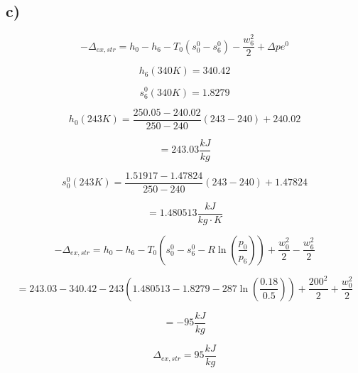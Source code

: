 

\subsection*{c)}

\[
-\Delta_{ex,str} = h_0 - h_6 - T_0 (s_0^0 - s_6^0) - \frac{w_6^2}{2} + \Delta p e^0
\]

\[
h_6 (340 K) = 340.42
\]

\[
s_6^0 (340 K) = 1.8279
\]

\[
h_0 (243 K) = \frac{250.05 - 240.02}{250 - 240} (243 - 240) + 240.02
\]

\[
= 243.03 \frac{kJ}{kg}
\]

\[
s_0^0 (243 K) = \frac{1.51917 - 1.47824}{250 - 240} (243 - 240) + 1.47824
\]

\[
= 1.480513 \frac{kJ}{kg \cdot K}
\]

\[
-\Delta_{ex,str} = h_0 - h_6 - T_0 (s_0^0 - s_6^0 - R \ln \left( \frac{p_0}{p_6} \right) ) + \frac{w_0^2}{2} - \frac{w_6^2}{2}
\]

\[
= 243.03 - 340.42 - 243 (1.480513 - 1.8279 - 287 \ln \left( \frac{0.18}{0.5} \right) ) + \frac{200^2}{2} + \frac{w_0^2}{2}
\]

\[
= -95 \frac{kJ}{kg}
\]

\[
\Delta_{ex,str} = 95 \frac{kJ}{kg}
\]